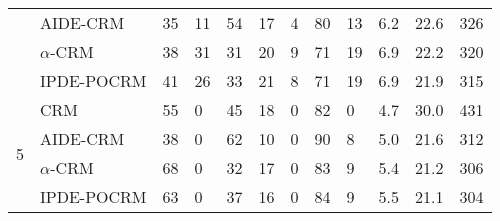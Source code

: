 \begin{tabular*}{\textwidth}{@{\extracolsep\fill}clllllllllll@{\extracolsep\fill}}
 & AIDE-CRM & 35 & 11 & 54 & 17 & 4 & 80 & 13 & 6.2 & 22.6 & 326\\
 & $\alpha$-CRM & 38 & 31 & 31 & 20 & 9 & 71 & 19 & 6.9 & 22.2 & 320\\
 & IPDE-POCRM & 41 & 26 & 33 & 21 & 8 & 71 & 19 & 6.9 & 21.9 & 315\\
\midrule
\multirow{4}{2em}{5} & CRM & 55 & 0 & 45 & 18 & 0 & 82 & 0 & 4.7 & 30.0 & 431\\
 & AIDE-CRM & 38 & 0 & 62 & 10 & 0 & 90 & 8 & 5.0 & 21.6 & 312\\
 & $\alpha$-CRM & 68 & 0 & 32 & 17 & 0 & 83 & 9 & 5.4 & 21.2 & 306\\
 & IPDE-POCRM & 63 & 0 & 37 & 16 & 0 & 84 & 9 & 5.5 & 21.1 & 304\\
\bottomrule
\end{tabular*}
